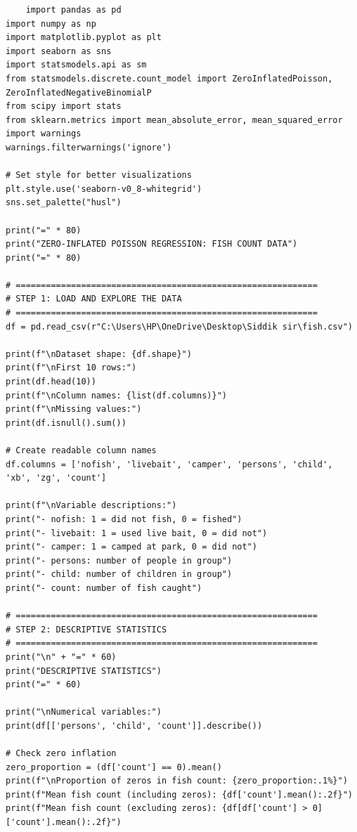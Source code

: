 \documentclass[12pt]{article}
\begin{document}
\begin{verbatim}
    import pandas as pd
import numpy as np
import matplotlib.pyplot as plt
import seaborn as sns
import statsmodels.api as sm
from statsmodels.discrete.count_model import ZeroInflatedPoisson, ZeroInflatedNegativeBinomialP
from scipy import stats
from sklearn.metrics import mean_absolute_error, mean_squared_error
import warnings
warnings.filterwarnings('ignore')

# Set style for better visualizations
plt.style.use('seaborn-v0_8-whitegrid')
sns.set_palette("husl")

print("=" * 80)
print("ZERO-INFLATED POISSON REGRESSION: FISH COUNT DATA")
print("=" * 80)

# ============================================================
# STEP 1: LOAD AND EXPLORE THE DATA
# ============================================================
df = pd.read_csv(r"C:\Users\HP\OneDrive\Desktop\Siddik sir\fish.csv")

print(f"\nDataset shape: {df.shape}")
print(f"\nFirst 10 rows:")
print(df.head(10))
print(f"\nColumn names: {list(df.columns)}")
print(f"\nMissing values:")
print(df.isnull().sum())

# Create readable column names
df.columns = ['nofish', 'livebait', 'camper', 'persons', 'child', 'xb', 'zg', 'count']

print(f"\nVariable descriptions:")
print("- nofish: 1 = did not fish, 0 = fished")
print("- livebait: 1 = used live bait, 0 = did not")
print("- camper: 1 = camped at park, 0 = did not")
print("- persons: number of people in group")
print("- child: number of children in group")
print("- count: number of fish caught")

# ============================================================
# STEP 2: DESCRIPTIVE STATISTICS
# ============================================================
print("\n" + "=" * 60)
print("DESCRIPTIVE STATISTICS")
print("=" * 60)

print("\nNumerical variables:")
print(df[['persons', 'child', 'count']].describe())

# Check zero inflation
zero_proportion = (df['count'] == 0).mean()
print(f"\nProportion of zeros in fish count: {zero_proportion:.1%}")
print(f"Mean fish count (including zeros): {df['count'].mean():.2f}")
print(f"Mean fish count (excluding zeros): {df[df['count'] > 0]['count'].mean():.2f}")
\end{verbatim}
\vspace{0.1cm}
\end{document}
